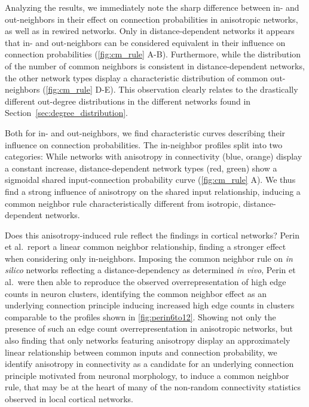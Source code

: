 Analyzing the results, we immediately note the sharp difference
between in- and out-neighbors in their effect on connection
probabilities in anisotropic networks, as well as in rewired
networks. Only in distance-dependent networks it appears that in- and
out-neighbors can be considered equivalent in their influence on
connection probabilities (\autoref{fig:cm_rule} A-B). Furthermore,
while the distribution of the number of common neighbors is consistent
in distance-dependent networks, the other network types display a
characteristic distribution of common out-neighbors
(\autoref{fig:cm_rule} D-E). This observation clearly relates to the
drastically different out-degree distributions in the different
networks found in
Section~\ref{sec:degree_distribution}. %

Both for in- and out-neighbors, we find characteristic curves
describing their influence on connection probabilities. The
in-neighbor profiles split into two categories: While networks with
anisotropy in connectivity (blue, orange) display a constant increase,
distance-dependent network types (red, green)  show a sigmoidal shared
input-connection probability curve (\autoref{fig:cm_rule} A).  We thus
find a strong influence of anisotropy on the shared input
relationship, inducing a common neighbor rule characteristically
different from isotropic, distance-depen\-dent networks.

Does this anisotropy-induced rule reflect the findings in cortical
networks?  Perin et al.\ report a linear common neighbor relationship,
finding a stronger effect when considering only in-neighbors. Imposing
the common neighbor rule on \textit{in silico} networks reflecting a
distance-dependency as determined \textit{in vivo}, Perin et al.\ were
then able to reproduce the observed overrepresentation of high edge
counts in neuron clusters, identifying the common neighbor effect as
an underlying connection principle inducing increased high edge counts
in clusters comparable to the profiles shown in
\autoref{fig:perin6to12}. Showing not only the presence of such an
edge count overrepresentation in anisotropic networks, but also
finding that only networks featuring anisotropy display an
approximately linear relationship between common inputs and connection
probability, we identify anisotropy in connectivity as a candidate for
an underlying connection principle motivated from neuronal morphology,
to induce a common neighbor rule, that may be at the heart of many of
the non-random connectivity statistics observed in local cortical
networks.


